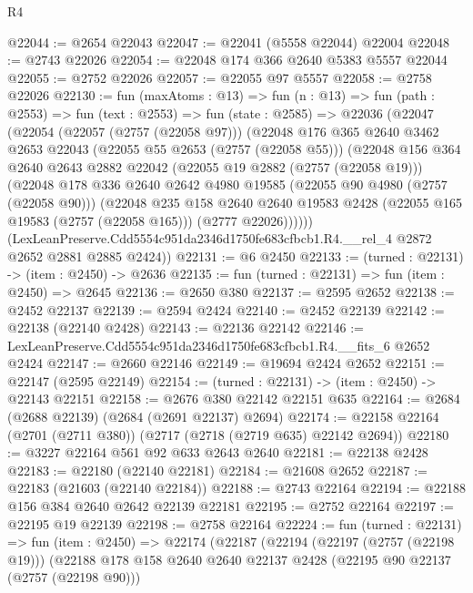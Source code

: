 \begin{lexlean}{R4}
\begin{coremodule}
@22044 := @2654 @22043
@22047 := @22041 (@5558 @22044) @22004
@22048 := @2743 @22026
@22054 := @22048 @174 @366 @2640 @5383 @5557 @22044
@22055 := @2752 @22026
@22057 := @22055 @97 @5557
@22058 := @2758 @22026
@22130 := fun (maxAtoms : @13) =>
  fun (n : @13) =>
  fun (path : @2553) =>
  fun (text : @2553) =>
  fun (state : @2585) =>
  @22036
    (@22047
      (@22054
        (@22057 (@2757 (@22058 @97)))
        (@22048
          @176
          @365
          @2640
          @3462
          @2653
          @22043
          (@22055 @55 @2653 (@2757 (@22058 @55)))
          (@22048
            @156
            @364
            @2640
            @2643
            @2882
            @22042
            (@22055 @19 @2882 (@2757 (@22058 @19)))
            (@22048
              @178
              @336
              @2640
              @2642
              @4980
              @19585
              (@22055 @90 @4980 (@2757 (@22058 @90)))
              (@22048
                @235
                @158
                @2640
                @2640
                @19583
                @2428
                (@22055 @165 @19583 (@2757 (@22058 @165)))
                (@2777 @22026))))))
      (LexLeanPreserve.Cdd5554c951da2346d1750fe683cfbcb1.R4.__rel_4 @2872 @2652 @2881 @2885 @2424))
@22131 := @6 @2450
@22133 := (turned : @22131) -> (item : @2450) -> @2636
@22135 := fun (turned : @22131) => fun (item : @2450) => @2645
@22136 := @2650 @380
@22137 := @2595 @2652
@22138 := @2452 @22137
@22139 := @2594 @2424
@22140 := @2452 @22139
@22142 := @22138 (@22140 @2428)
@22143 := @22136 @22142
@22146 := LexLeanPreserve.Cdd5554c951da2346d1750fe683cfbcb1.R4.__fits_6 @2652 @2424
@22147 := @2660 @22146
@22149 := @19694 @2424 @2652
@22151 := @22147 (@2595 @22149)
@22154 := (turned : @22131) -> (item : @2450) -> @22143 @22151
@22158 := @2676 @380 @22142 @22151 @635
@22164 := @2684 (@2688 @22139) (@2684 (@2691 @22137) @2694)
@22174 := @22158 @22164 (@2701 (@2711 @380)) (@2717 (@2718 (@2719 @635) @22142 @2694))
@22180 := @3227 @22164 @561 @92 @633 @2643 @2640
@22181 := @22138 @2428
@22183 := @22180 (@22140 @22181)
@22184 := @21608 @2652
@22187 := @22183 (@21603 (@22140 @22184))
@22188 := @2743 @22164
@22194 := @22188 @156 @384 @2640 @2642 @22139 @22181
@22195 := @2752 @22164
@22197 := @22195 @19 @22139
@22198 := @2758 @22164
@22224 := fun (turned : @22131) =>
  fun (item : @2450) =>
  @22174
    (@22187
      (@22194
        (@22197 (@2757 (@22198 @19)))
        (@22188
          @178
          @158
          @2640
          @2640
          @22137
          @2428
          (@22195 @90 @22137 (@2757 (@22198 @90)))

\end{coremodule}
\end{lexlean}
